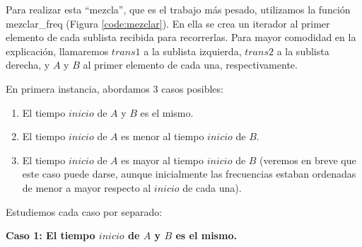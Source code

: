 Para realizar esta ``mezcla'', que es el trabajo más pesado, utilizamos la función {\sc mezclar_freq} (Figura \ref{code:mezclar}). En ella se crea un iterador al primer elemento de cada sublista recibida para recorrerlas.  Para mayor comodidad en la explicación, llamaremos $trans1$ a la sublista izquierda, $trans2$ a la sublista derecha, y $A$ y $B$ al primer elemento de cada una, respectivamente.

En primera instancia, abordamos 3 casos posibles: 

\begin{enumerate}
\item El tiempo $inicio$ de $A$ y $B$ es el mismo.
\item El tiempo $inicio$ de $A$ es menor al tiempo $inicio$ de $B$.
\item El tiempo $inicio$ de $A$ es mayor al tiempo $inicio$ de $B$ (veremos en breve que este caso puede darse, aunque inicialmente las frecuencias estaban ordenadas de menor a mayor respecto al $inicio$ de cada una).
\end{enumerate}

Estudiemos cada caso por separado:

\vspace*{0.15cm}

{\bf Caso 1: El tiempo $inicio$ de $A$ y $B$ es el mismo.}

